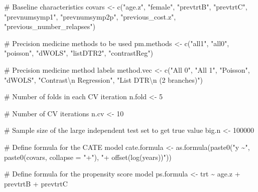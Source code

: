 \documentclass[
  letterpaper,
  DIV=11,
  numbers=noendperiod]{scrreprt}
\newenvironment{Shaded}{\begin{snugshade}}{\end{snugshade}}
\newcommand{\AttributeTok}[1]{\textcolor[rgb]{0.40,0.45,0.13}{#1}}
\newcommand{\CommentTok}[1]{\textcolor[rgb]{0.37,0.37,0.37}{#1}}
\newcommand{\DecValTok}[1]{\textcolor[rgb]{0.68,0.00,0.00}{#1}}
\newcommand{\FunctionTok}[1]{\textcolor[rgb]{0.28,0.35,0.67}{#1}}
\newcommand{\NormalTok}[1]{\textcolor[rgb]{0.00,0.23,0.31}{#1}}
\newcommand{\OtherTok}[1]{\textcolor[rgb]{0.00,0.23,0.31}{#1}}
\newcommand{\SpecialCharTok}[1]{\textcolor[rgb]{0.37,0.37,0.37}{#1}}
\newcommand{\StringTok}[1]{\textcolor[rgb]{0.13,0.47,0.30}{#1}}
\begin{document}
\begin{Shaded}
\begin{Highlighting}[]
\CommentTok{\# Baseline characteristics}
\NormalTok{covars }\OtherTok{\textless{}{-}} \FunctionTok{c}\NormalTok{(}\StringTok{"age.z"}\NormalTok{, }\StringTok{"female"}\NormalTok{, }\StringTok{"prevtrtB"}\NormalTok{, }\StringTok{"prevtrtC"}\NormalTok{, }\StringTok{"prevnumsymp1"}\NormalTok{, }
            \StringTok{"prevnumsymp2p"}\NormalTok{, }\StringTok{"previous\_cost.z"}\NormalTok{, }\StringTok{"previous\_number\_relapses"}\NormalTok{)}

\CommentTok{\# Precision medicine methods to be used}
\NormalTok{pm.methods }\OtherTok{\textless{}{-}} \FunctionTok{c}\NormalTok{(}\StringTok{"all1"}\NormalTok{, }\StringTok{"all0"}\NormalTok{, }\StringTok{"poisson"}\NormalTok{, }\StringTok{"dWOLS"}\NormalTok{, }\StringTok{"listDTR2"}\NormalTok{, }
                \StringTok{"contrastReg"}\NormalTok{)}

\CommentTok{\# Precision medicine method labels}
\NormalTok{method.vec }\OtherTok{\textless{}{-}} \FunctionTok{c}\NormalTok{(}\StringTok{"All 0"}\NormalTok{, }\StringTok{"All 1"}\NormalTok{, }\StringTok{"Poisson"}\NormalTok{, }\StringTok{"dWOLS"}\NormalTok{, }
                \StringTok{"Contrast}\SpecialCharTok{\textbackslash{}n}\StringTok{ Regression"}\NormalTok{, }\StringTok{"List DTR}\SpecialCharTok{\textbackslash{}n}\StringTok{ (2 branches)"}\NormalTok{)}

\CommentTok{\# Number of folds in each CV iteration}
\NormalTok{n.fold }\OtherTok{\textless{}{-}} \DecValTok{5}

\CommentTok{\# Number of CV iterations}
\NormalTok{n.cv }\OtherTok{\textless{}{-}} \DecValTok{10}

\CommentTok{\# Sample size of the large independent test set to get true value}
\NormalTok{big.n }\OtherTok{\textless{}{-}} \DecValTok{100000}

\CommentTok{\# Define formula for the CATE model}
\NormalTok{cate.formula }\OtherTok{\textless{}{-}} \FunctionTok{as.formula}\NormalTok{(}\FunctionTok{paste0}\NormalTok{(}\StringTok{"y \textasciitilde{}"}\NormalTok{, }\FunctionTok{paste0}\NormalTok{(covars, }\AttributeTok{collapse =} \StringTok{"+"}\NormalTok{), }
                                  \StringTok{"+ offset(log(years))"}\NormalTok{))}

\CommentTok{\# Define formula for the propensity score model}
\NormalTok{ps.formula }\OtherTok{\textless{}{-}}\NormalTok{ trt }\SpecialCharTok{\textasciitilde{}}\NormalTok{ age.z }\SpecialCharTok{+}\NormalTok{ prevtrtB }\SpecialCharTok{+}\NormalTok{ prevtrtC}


\end{Highlighting}
\end{Shaded}
\end{document}

